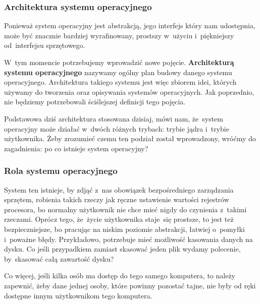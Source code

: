\documentclass[10pt,t]{beamer}
\begin{document}







\begin{frame}
  \frametitle{Architektura systemu operacyjnego}


  Ponieważ system operacyjny jest abstrakcją, jego interfejs który
  nam udostępnia, może być znacznie bardziej wyrafinowany, prostszy
  w~użyciu i~piękniejszy od~interfejsu sprzętowego.

  W~tym momencie potrzebujemy wprowadzić nowe pojęcie.
  \textbf{Architekturą systemu operacyjnego} nazywamy ogólny plan budowy
  danego systemu operacyjnego. Architektura takiego systemu jest więc
  zbiorem idei, których używamy do tworzenia oraz opisywania systemów
  operacyjnych. Jak poprzednio, nie będziemy potrzebowali ściślejszej
  definicji tego pojęcia.

  Podstawowa dziś architektura stosowana dzisiaj, mówi nam, że~system
  operacyjny może działać w~dwóch różnych trybach: trybie jądra i~trybie
  użytkownika. Żeby zrozumieć czemu ten podział został wprowadzony,
  wróćmy do zagadnienia: po co istnieje system operacyjny?

\end{frame}





\begin{frame}
  \frametitle{Rola systemu operacyjnego}


  System ten istnieje, by zdjąć z~nas obowiązek bezpośredniego zarządzania
  sprzętem, robienia takich rzeczy jak ręczne ustawienie wartości rejestrów
  procesora, bo normalny użytkownik nie chce mieć nigdy do czynienia
  z~takimi rzeczami. Oprócz tego, że~życie użytkownika staje~się prostsze,
  to jest też bezpieczniejsze, bo pracując na niskim poziomie abstrakcji,
  łatwiej o~pomyłki i~poważne błędy. Przykładowo, potrzebuje mieć możliwość
  kasowania danych na dysku. Co jeśli przypadkiem zamiast skasować jeden
  plik wydamy polecenie, by~skasować całą zawartość dysku?

  Co więcej, jeśli kilka osób ma dostęp do tego samego komputera, to
  należy zapewnić, żeby dane jednej osoby, które powinny pozostać tajne, nie
  były od ręki dostępne innym użytkownikom tego komputera.

\end{frame}
\end{document}
